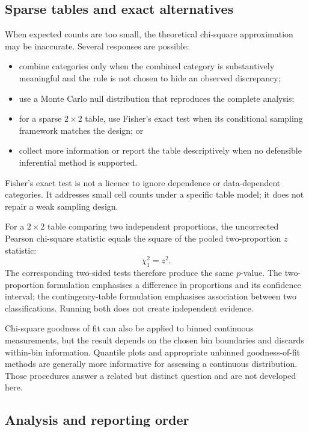 \subsection{Sparse tables and exact alternatives}

When expected counts are too small, the theoretical chi-square approximation may be inaccurate. Several responses are possible:
\begin{itemize}
  \item combine categories only when the combined category is substantively meaningful and the rule is not chosen to hide an observed discrepancy;
  \item use a Monte Carlo null distribution that reproduces the complete analysis;
  \item for a sparse $2\times2$ table, use Fisher's exact test when its conditional sampling framework matches the design; or
  \item collect more information or report the table descriptively when no defensible inferential method is supported.
\end{itemize}
Fisher's exact test is not a licence to ignore dependence or data-dependent categories. It addresses small cell counts under a specific table model; it does not repair a weak sampling design.

For a $2\times2$ table comparing two independent proportions, the uncorrected Pearson chi-square statistic equals the square of the pooled two-proportion $z$ statistic:
\[
\chi^2_1=z^2.
\]
The corresponding two-sided tests therefore produce the same $p$-value. The two-proportion formulation emphasises a difference in proportions and its confidence interval; the contingency-table formulation emphasises association between two classifications. Running both does not create independent evidence.

Chi-square goodness of fit can also be applied to binned continuous measurements, but the result depends on the chosen bin boundaries and discards within-bin information. Quantile plots and appropriate unbinned goodness-of-fit methods are generally more informative for assessing a continuous distribution. Those procedures answer a related but distinct question and are not developed here.

\subsection{Analysis and reporting order}

